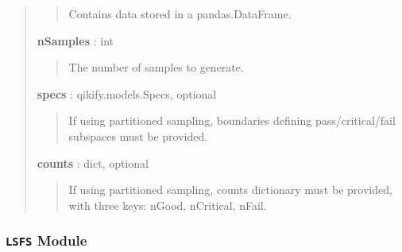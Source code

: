 \documentclass[letterpaper,10pt,english]{sphinxmanual}
\begin{document}
\begin{fulllineitems}
\begin{fulllineitems}
\begin{quote}
\begin{description}
\begin{quote}
Contains data stored in a pandas.DataFrame.
\end{quote}

\textbf{nSamples} : int
\begin{quote}

The number of samples to generate.
\end{quote}

\textbf{specs} : qikify.models.Specs, optional
\begin{quote}

If using partitioned sampling, boundaries defining pass/critical/fail subspaces must be provided.
\end{quote}

\textbf{counts} : dict, optional
\begin{quote}

If using partitioned sampling, counts dictionary must be provided, with three keys: nGood, nCritical, nFail.
\end{quote}

\end{description}\end{quote}

\end{fulllineitems}


\end{fulllineitems}



\subsubsection{\texttt{LSFS} Module}
\label{qikify.controllers:lsfs-module}\label{qikify.controllers:module-qikify.controllers.LSFS}
\end{document}
